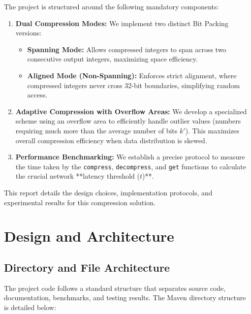 \documentclass[11pt, a4paper]{article}
\begin{document}
	The project is structured around the following mandatory components:
	
	\begin{enumerate}
		\item \textbf{Dual Compression Modes:} We implement two distinct Bit Packing versions:
		\begin{itemize}
			\item \textbf{Spanning Mode:} Allows compressed integers to span across two consecutive output integers, maximizing space efficiency.
			\item \textbf{Aligned Mode (Non-Spanning):} Enforces strict alignment, where compressed integers never cross 32-bit boundaries, simplifying random access.
		\end{itemize}
		
		\item \textbf{Adaptive Compression with Overflow Areas:} We develop a specialized scheme using an overflow area to efficiently handle outlier values (numbers requiring much more than the average number of bits $k'$). This maximizes overall compression efficiency when data distribution is skewed.
		
		\item \textbf{Performance Benchmarking:} We establish a precise protocol to measure the time taken by the \texttt{compress}, \texttt{decompress}, and \texttt{get} functions to calculate the crucial network **latency threshold ($t$)**.
	\end{enumerate}
	This report details the design choices, implementation protocols, and experimental results for this compression solution.
	
	
	\section{Design and Architecture}
	
	\subsection{Directory and File Architecture}
	
	The project code follows a standard structure that separates source code, documentation, benchmarks, and testing results. The Maven directory structure is detailed below:
	
\end{document}
